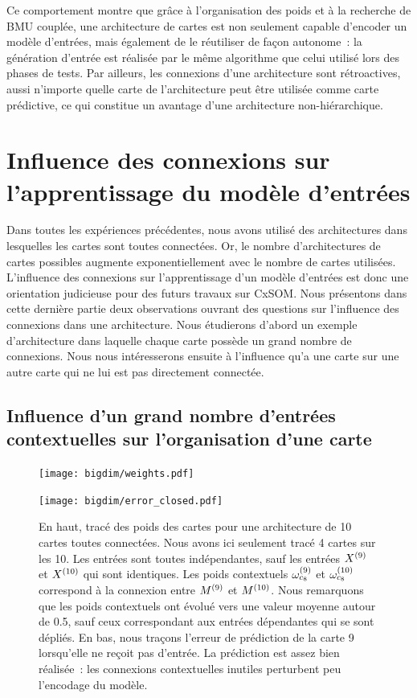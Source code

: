 \documentclass[../main]{subfiles}
\begin{document}
Ce comportement montre que grâce à l'organisation des poids et à la recherche de BMU couplée, une architecture de cartes est non seulement capable d'encoder un modèle d'entrées, mais également de le réutiliser de façon autonome~: la génération d'entrée est réalisée par le même algorithme que celui utilisé lors des phases de tests.
Par ailleurs, les connexions d'une architecture sont rétroactives, aussi n'importe quelle carte de l'architecture peut être utilisée comme carte prédictive, ce qui constitue un avantage d'une architecture non-hiérarchique.


\section{Influence des connexions sur l'apprentissage du modèle d'entrées}

Dans toutes les expériences précédentes, nous avons utilisé des architectures dans lesquelles les cartes sont toutes connectées. Or, le nombre d'architectures de cartes possibles augmente exponentiellement avec le nombre de cartes utilisées.
L'influence des connexions sur l'apprentissage d'un modèle d'entrées est donc une orientation judicieuse pour des futurs travaux sur CxSOM.
Nous présentons dans cette dernière partie deux observations ouvrant des questions sur l'influence des connexions dans une architecture.
Nous étudierons d'abord un exemple d'architecture dans laquelle chaque carte possède un grand nombre de connexions.
Nous nous intéresserons ensuite à l'influence qu'a une carte sur une autre carte qui ne lui est pas directement connectée.

\subsection{Influence d'un grand nombre d'entrées contextuelles sur l'organisation d'une carte}

\begin{figure}
	\begin{minipage}{\textwidth}
	\texttt{[image: bigdim/weights.pdf]}
	\end{minipage}
\begin{minipage}{\textwidth}
	\centering\texttt{[image: bigdim/error\_closed.pdf]}
	\caption{En haut, tracé des poids des cartes pour une architecture de 10 cartes toutes connectées. Nous avons ici seulement tracé 4 cartes sur les 10. Les entrées sont toutes indépendantes, sauf les entrées $X^{({9})}$ et $X^{({10})}$ qui sont identiques. Les poids contextuels $\omega_{c_8}^{({9})}$ et $\omega_{c_8}^{({10})}$ correspond à la connexion entre $M^{({9})}$ et $M^{({10})}$.
	Nous remarquons que les poids contextuels ont évolué vers une valeur moyenne autour de 0.5, sauf ceux correspondant aux entrées dépendantes qui se sont dépliés.
	En bas, nous traçons l'erreur de prédiction de la carte 9 lorsqu'elle ne reçoit pas d'entrée. La prédiction est assez bien réalisée~: les connexions contextuelles inutiles perturbent peu l'encodage du modèle. \label{fig:bigdim}}
\end{minipage}
\end{figure}
\end{document}

